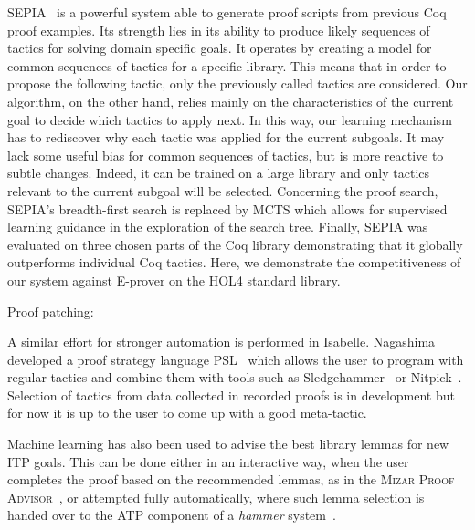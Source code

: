 \documentclass[runningheads,a4paper,draft]{svjour3}
\def\holfour{\textsf{HOL4}\xspace}
\def\isabelle{\textsf{Isabelle}\xspace}
\def\coq{\textsf{Coq}\xspace}
\def\eprover{\textsf{E-prover}\xspace}
\def\sledgehammer{\textsf{Sledgehammer}\xspace}
\begin{document}
\textsf{SEPIA}~\cite{DBLP:conf/cade/GransdenWR15} is a powerful system able to
generate
proof scripts from previous \coq proof examples.
Its strength lies in its ability to produce likely sequences
of tactics for solving domain specific goals. It operates by creating a model
for common sequences of tactics for a specific library.
This means that in order to propose the following tactic, only the previously
called tactics
are considered.
Our algorithm, on the other hand, relies mainly on the characteristics of the
current goal
to decide
which tactics to apply next. In this way, our learning mechanism has to
rediscover why each
tactic was applied for the current subgoals. It may lack some useful bias for
common sequences
of tactics, but is more reactive to subtle changes. Indeed, it can be trained
on a large library and only tactics relevant to the current subgoal will be
selected.
Concerning the proof search, \textsf{SEPIA}'s %
breadth-first search is replaced by MCTS which allows for supervised learning
guidance in the exploration of the search tree.
Finally, \textsf{SEPIA} was evaluated on three chosen parts of the
\coq library demonstrating that it globally outperforms individual \coq
tactics. Here, we demonstrate the competitiveness of our system against
\eprover on the \holfour standard library.

Proof patching: \cite{RingerYLG18}

A similar effort for stronger automation is performed in \isabelle. Nagashima
developed a proof strategy language PSL~\cite{NagashimaK17psl} which allows the
user to
program with regular tactics and combine them with tools such as
\sledgehammer~\cite{sledgehammer10} or Nitpick~\cite{Nitpick10}.
Selection of tactics from data collected in recorded proofs is in development
but for now it is up to the user to come up with a good meta-tactic.


Machine learning has also been used to advise the best library lemmas for new
ITP goals.
This can be done either in an interactive way, when the user completes the
proof based on the recommended lemmas, as in the \textsc{Mizar Proof
Advisor}~\cite{Urb04-MPTP0}, or attempted fully automatically, where such lemma
selection is handed over to the ATP component of a \emph{hammer}
system~\cite{hammers4qed,tgck-cpp15,holyhammer,BlanchetteGKKU16,mizAR40}.
\end{document}
